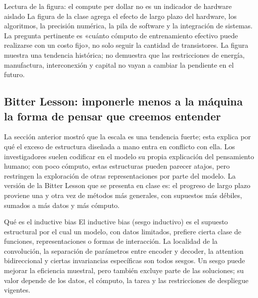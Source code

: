 \begin{knowledgebox}{Lectura de la figura: el compute per dollar no es un indicador de hardware aislado}
La figura de la clase agrega el efecto de largo plazo del hardware, los algoritmos, la precisión numérica, la pila de software y la integración de sistemas. La pregunta pertinente es «cuánto cómputo de entrenamiento efectivo puede realizarse con un costo fijo», no solo seguir la cantidad de transistores. La figura muestra una tendencia histórica; no demuestra que las restricciones de energía, manufactura, interconexión y capital no vayan a cambiar la pendiente en el futuro.
\end{knowledgebox}


\subsection{Bitter Lesson: imponerle menos a la máquina la forma de pensar que creemos entender}

La sección anterior mostró que la escala es una tendencia fuerte; esta explica por qué el exceso de estructura diseñada a mano entra en conflicto con ella. Los investigadores suelen codificar en el modelo su propia explicación del pensamiento humano; con poco cómputo, estas estructuras pueden parecer atajos, pero restringen la exploración de otras representaciones por parte del modelo. La versión de la Bitter Lesson que se presenta en clase es: el progreso de largo plazo proviene una y otra vez de métodos más generales, con supuestos más débiles, sumados a más datos y más cómputo.



\begin{importantbox}{Qué es el inductive bias}
El inductive bias (sesgo inductivo) es el supuesto estructural por el cual un modelo, con datos limitados, prefiere cierta clase de funciones, representaciones o formas de interacción. La localidad de la convolución, la separación de parámetros entre encoder y decoder, la attention bidireccional y ciertas invariancias específicas son todos sesgos. Un sesgo puede mejorar la eficiencia muestral, pero también excluye parte de las soluciones; su valor depende de los datos, el cómputo, la tarea y las restricciones de despliegue vigentes.
\end{importantbox}

